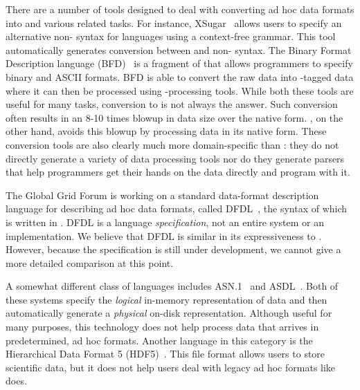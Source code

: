 There are a number of tools designed to deal with converting ad hoc
data formats into \xml{} and various related tasks.  For instance,
XSugar~\cite{brabrand+:xsugar2005} allows users to specify an
alternative non-\xml{} syntax for \xml{} languages using a context-free
grammar.  This tool automatically generates conversion between \xml{} and
non-\xml{} syntax.  The Binary Format Description language 
(BFD)~\cite{bfd} is a fragment of
\xml{} that allows programmers to specify binary and ASCII formats.  BFD
is able to convert the raw data into \xml{}-tagged data where it can then be
processed using \xml{}-processing tools.    While both these tools are 
useful for many
tasks, conversion to \xml{} is not always the answer.  Such conversion
often results in an 8-10 times blowup in data size over the native form.
\padsml{}, on the other hand, avoids this blowup by processing data in its 
native form.  These conversion tools are also clearly much more 
domain-specific than \padsml{}:  they do not directly generate a variety of 
data processing tools nor do they generate parsers that help programmers
get their hands on the data directly and program with it.

The Global Grid Forum is working on a standard data-format description
language for describing ad hoc data formats, called
DFDL~\cite{dfdl-proposal,dfdl-primer}, the syntax of which is written
in \xml. DFDL is a language \textit{specification}, not an entire
system or an implementation.  We believe that DFDL is similar in its
expressiveness to \padsc{}.  However, because the specification is
still under development, we cannot give a more detailed comparison at
this point.


A somewhat different class of languages includes
\textsc{ASN.1}~\cite{asn} and \textsc{ASDL}~\cite{asdl}.  Both of
these systems specify the {\em logical\/} in-memory representation of
data and then automatically generate a {\em physical\/} on-disk
representation.  Although useful for many purposes, this technology
does not help process data that arrives in predetermined, ad hoc
formats.  Another language in this category is the Hierarchical Data
Format 5 (HDF5)~\cite{hdf5}.  This file format allows users to store
scientific data, but it does not help users deal with legacy ad hoc
formats like \padsml{} does.

